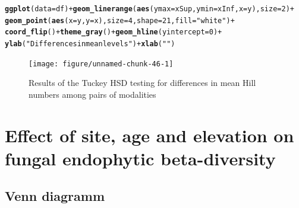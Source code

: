 \documentclass[12pt]{article}\usepackage[]{graphicx}\usepackage[]{color}
\makeatletter
\newcommand{\hlnum}[1]{\textcolor[rgb]{0.686,0.059,0.569}{#1}}%
\newcommand{\hlstr}[1]{\textcolor[rgb]{0.192,0.494,0.8}{#1}}%
\newcommand{\hlopt}[1]{\textcolor[rgb]{0,0,0}{#1}}%
\newcommand{\hlstd}[1]{\textcolor[rgb]{0.345,0.345,0.345}{#1}}%
\newcommand{\hlkwc}[1]{\textcolor[rgb]{0.333,0.667,0.333}{#1}}%
\newcommand{\hlkwd}[1]{\textcolor[rgb]{0.737,0.353,0.396}{\textbf{#1}}}%
\newenvironment{kframe}{%
 \def\at@end@of@kframe{}%
 \ifinner\ifhmode%
  \def\at@end@of@kframe{\end{minipage}}%
  \begin{minipage}{\columnwidth}%
 \fi\fi%
 \def\FrameCommand##1{\hskip\@totalleftmargin \hskip-\fboxsep
 \colorbox{shadecolor}{##1}\hskip-\fboxsep
     \hskip-\linewidth \hskip-\@totalleftmargin \hskip\columnwidth}%
 \MakeFramed {\advance\hsize-\width
   \@totalleftmargin\z@ \linewidth\hsize
   \@setminipage}}%
 {\par\unskip\endMakeFramed%
 \at@end@of@kframe}
\newenvironment{knitrout}{}{} %
\numberwithin{figure}{section}
\makeatother
\begin{document}
\begin{knitrout}\small
{}\color{fgcolor}\begin{kframe}
\begin{alltt}
\hlkwd{ggplot}\hlstd{(}\hlkwc{data} \hlstd{= df)} \hlopt{+} \hlkwd{geom_linerange}\hlstd{(}\hlkwd{aes}\hlstd{(}\hlkwc{ymax} \hlstd{= xSup,} \hlkwc{ymin} \hlstd{= xInf,} \hlkwc{x} \hlstd{= y),} \hlkwc{size} \hlstd{=} \hlnum{2}\hlstd{)} \hlopt{+}
  \hlkwd{geom_point}\hlstd{(}\hlkwd{aes}\hlstd{(}\hlkwc{x}\hlstd{=y,} \hlkwc{y}\hlstd{=x),} \hlkwc{size}\hlstd{=}\hlnum{4}\hlstd{,} \hlkwc{shape}\hlstd{=}\hlnum{21}\hlstd{,} \hlkwc{fill}\hlstd{=}\hlstr{"white"}\hlstd{)} \hlopt{+}
  \hlkwd{coord_flip}\hlstd{()} \hlopt{+} \hlkwd{theme_gray}\hlstd{()} \hlopt{+} \hlkwd{geom_hline}\hlstd{(}\hlkwc{yintercept} \hlstd{=} \hlnum{0}\hlstd{)} \hlopt{+}
  \hlkwd{ylab}\hlstd{(}\hlstr{"Differences in mean levels"}\hlstd{)} \hlopt{+} \hlkwd{xlab}\hlstd{(}\hlstr{""}\hlstd{)}
\end{alltt}
\end{kframe}\begin{figure}

{\centering \texttt{[image: figure/unnamed-chunk-46-1]} 

}

\caption[Results of the Tuckey HSD testing for differences in mean Hill numbers among pairs of modalities]{Results of the Tuckey HSD testing for differences in mean Hill numbers among pairs of modalities}\label{fig:unnamed-chunk-46}
\end{figure}


\end{knitrout}

\clearpage
\section{Effect of site, age and elevation on fungal endophytic beta-diversity}

  \subsection{Venn diagramm}
\end{document}
